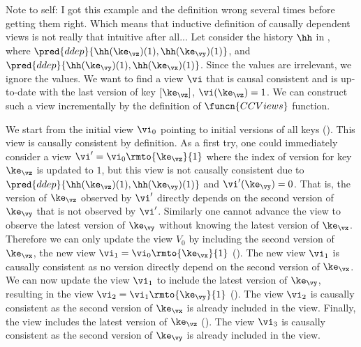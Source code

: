\ac{Note to self: I got this example and the definition wrong several times before getting them
right. Which means that inductive definition of causally dependent views is not really that 
intuitive after all...}
Let consider the history $\hh$ in , where $\pred{ddep}{\hh(\ke_\vz)(1),\hh(\ke_{\vy})(1)}$, and $\pred{ddep}{\hh(\ke_{\vy})(1) ,\hh(\ke_{\vx})(1)}$.
Since the values are irrelevant, we ignore the values.
We want to find a view $\vi$ that is causal consistent and is up-to-date with the last version of key $[\ke_{\vz}]$, \ie \( \vi(\ke_\vz) = 1\).
We can construct such a view incrementally by the definition of \( \funcn{CCViews} \) function.

We start from the initial view $\vi_0$ pointing to initial versions of all keys ().
This view is causally consistent by definition.
As a first try, one could immediately consider a view $\vi'= \vi_0\rmto{\ke_\vz}{1}$ where the index of version for key $\ke_\vz$ is updated to $1$, but this view is not causally consistent due to \( \pred{ddep}{\hh(\ke_\vz)(1),\hh(\ke_{\vy})(1)} \) and \( \vi'(\ke_\vy) = 0\).
That is, the version of $\ke_\vz$ observed by $\vi'$ directly depends on the second version of $\ke_\vy$ that is not observed by $\vi'$.
Similarly one cannot advance the view to observe the latest version of \( \ke_\vy\) without knowing the latest version of \( \ke_\vx\).
Therefore we can only update the view $V_0$ by including the second version of $\ke_{\vx}$, \ie the new view \(\vi_1 = \vi_0\rmto{\ke_\vx}{1} \) ().
The new view \( \vi_1\) is causally consistent as no version directly depend on the second version of \( \ke_\vx\).
We can now update the view $\vi_1$ to include the latest version of $\ke_{\vy}$, resulting in the view $\vi_2 = \vi_1\rmto{\ke_{\vy}}{1}$ (). 
The view \( \vi_2\) is causally consistent as the second version of \( \ke_\vx\) is already included in the view.
Finally, the view includes the latest version of \( \ke_\vz \) ().
The view \( \vi_3\) is causally consistent as the second version of \( \ke_\vy\) is already included in the view.


